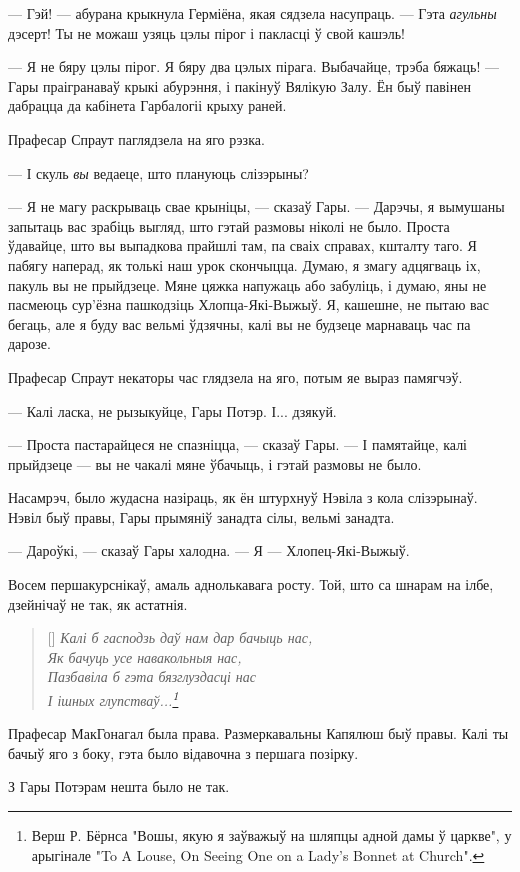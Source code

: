 \later

--- Гэй! --- абурана крыкнула Герміёна, якая сядзела насупраць. --- Гэта \emph{агульны}
дэсерт! Ты не можаш узяць цэлы пірог і пакласці ў свой кашэль!

--- Я не бяру цэлы пірог. Я бяру два цэлых пірага. Выбачайце, трэба бяжаць! --- 
Гары праігранаваў крыкі абурэння, і пакінуў Вялікую Залу. Ён быў павінен дабрацца 
да кабінета Гарбалогіі крыху раней.

\later

Прафесар Спраут паглядзела на яго рэзка. 

--- І скуль  \emph{вы} ведаеце, што плануюць слізэрыны?

--- Я не магу раскрываць свае крыніцы, --- сказаў Гары. --- Дарэчы, я вымушаны 
запытаць вас зрабіць выгляд, што гэтай размовы ніколі не было. Проста ўдавайце, 
што вы выпадкова прайшлі там, па сваіх справах, кшталту таго. Я пабягу наперад,
як толькі наш урок скончыцца. Думаю, я змагу адцягваць іх, пакуль вы не прыйдзеце.
Мяне цяжка напужаць або забуліць, і думаю, яны не пасмеюць сур'ёзна пашкодзіць 
Хлопца-Які-Выжыў. Я, кашешне, не пытаю вас бегаць, але я буду вас вельмі
ўдзячны, калі вы не будзеце марнаваць час па дарозе.

Прафесар Спраут некаторы час глядзела на яго, потым яе выраз памягчэў.

--- Калі ласка, не рызыкуйце, Гары Потэр. І... дзякуй.

--- Проста пастарайцеся не спазніцца, --- сказаў Гары. --- І памятайце, калі 
прыйдзеце --- вы не чакалі мяне ўбачыць, і гэтай размовы не было.


\later

Насамрэч, было жудасна назіраць, як ён штурхнуў Нэвіла з кола слізэрынаў. 
Нэвіл быў правы, Гары прымяніў занадта сілы, вельмі занадта.

--- Дароўкі, --- сказаў Гары халодна. --- Я --- Хлопец-Які-Выжыў.

Восем першакурснікаў, амаль аднолькавага росту. Той, што са шнарам на ілбе,
дзейнічаў не так, як астатнія.


\baselineskip\settowidth{\versewidth}{Калі б гасподзь даў нам дар бачыць нас,}
\begin{verse}[\versewidth]
\itshape
Калі б гасподзь даў нам дар бачыць нас,\\ 
Як бачуць усе навакольныя нас,\\
Пазбавіла б гэта бязглуздасці нас\\
І ішных глупстваў...\footnote{{} Верш Р. Бёрнса "Вошы, якую я заўважыў на шляпцы адной дамы ў царкве", у 
арыгінале "To A Louse, On Seeing One on a Lady's Bonnet at Church".}
\end{verse}


Прафесар МакГонагал была права. Размеркавальны Капялюш быў правы. Калі ты бачыў яго 
з боку, гэта было відавочна з першага позірку. 

З Гары Потэрам нешта было не так.
